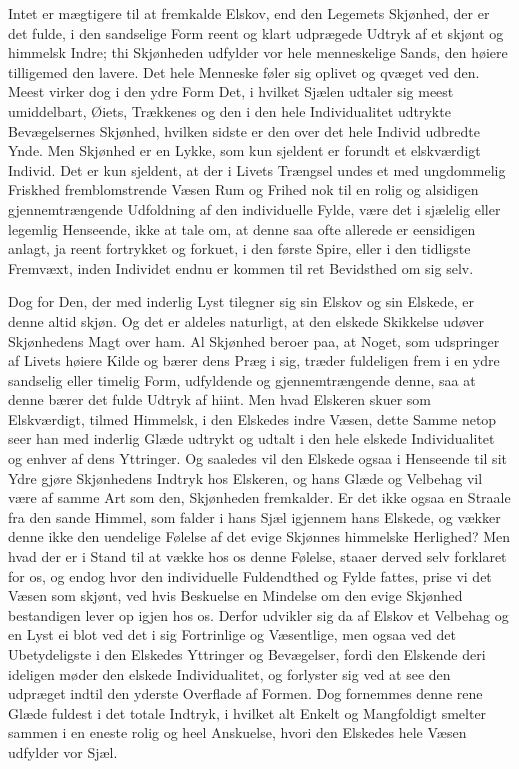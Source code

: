\documentclass[12pt,a4paper]{book}
\newcommand{\apage}[1]{\marginnote{\footnotesize\textit{[#1]}}}
\begin{document}
Intet er mægtigere til at fremkalde Elskov, end den Legemets Skjønhed,
der er det fulde, i den sandselige Form reent og klart udprægede Udtryk
af et skjønt og himmelsk Indre; thi Skjønheden udfylder vor hele
menneskelige Sands, den høiere tilligemed den lavere. Det hele Menneske
føler sig oplivet og qvæget ved den. Meest virker dog i den ydre Form
Det, i hvilket Sjælen udtaler sig meest umiddelbart, Øiets, Trækkenes
og den i den hele Individualitet udtrykte Bevægelsernes Skjønhed,
hvilken sidste er den over det hele Individ udbredte Ynde. Men Skjønhed
er en Lykke, som kun sjeldent er forundt et elskværdigt Individ. Det er
kun sjeldent, at der i Livets Trængsel undes et med ungdommelig Friskhed
fremblomstrende Væsen Rum og Frihed nok til en rolig og alsidigen
gjennemtrængende Udfoldning af den individuelle Fylde, være det i \apage{16}
sjælelig eller legemlig Henseende, ikke at tale om, at denne saa ofte
allerede er eensidigen anlagt, ja reent fortrykket og forkuet, i den
første Spire, eller i den tidligste Fremvæxt, inden Individet endnu er
kommen til ret Bevidsthed om sig selv.

Dog for Den, der med inderlig Lyst tilegner sig sin Elskov og sin
Elskede, er denne altid skjøn. Og det er aldeles naturligt, at den
elskede Skikkelse udøver Skjønhedens Magt over ham. Al Skjønhed beroer
paa, at Noget, som udspringer af Livets høiere Kilde og bærer dens Præg
i sig, træder fuldeligen frem i en ydre sandselig eller timelig Form,
udfyldende og gjennemtrængende denne, saa at denne bærer det fulde
Udtryk af hiint. Men hvad Elskeren skuer som Elskværdigt, tilmed
Himmelsk, i den Elskedes indre Væsen, dette Samme netop seer han med
inderlig Glæde udtrykt og udtalt i den hele elskede Individualitet og
enhver af dens Yttringer. Og saaledes vil den Elskede ogsaa i
Henseende til sit Ydre gjøre Skjønhedens Indtryk hos Elskeren, og hans
Glæde og Velbehag vil være af samme Art som den, Skjønheden fremkalder.
Er det ikke ogsaa en Straale fra den sande Himmel, som falder i hans
Sjæl igjennem hans Elskede, og vækker denne ikke den uendelige Følelse
af det evige Skjønnes himmelske Herlighed? Men hvad der er i Stand til
at vække hos os denne Følelse, staaer derved selv forklaret for os, og
endog hvor den individuelle Fuldendthed og Fylde fattes, prise vi det
Væsen som skjønt, ved hvis \apage{17} Beskuelse en Mindelse om den evige Skjønhed
bestandigen lever op igjen hos os. Derfor udvikler sig da af Elskov et
Velbehag og en Lyst ei blot ved det i sig Fortrinlige og Væsentlige,
men ogsaa ved det Ubetydeligste i den Elskedes Yttringer og Bevægelser,
fordi den Elskende deri ideligen møder den elskede Individualitet, og
forlyster sig ved at see den udpræget indtil den yderste Overflade af
Formen. Dog fornemmes denne rene Glæde fuldest i det totale Indtryk, i
hvilket alt Enkelt og Mangfoldigt smelter sammen i en eneste rolig og
heel Anskuelse, hvori den Elskedes hele Væsen udfylder vor Sjæl.
\end{document}
